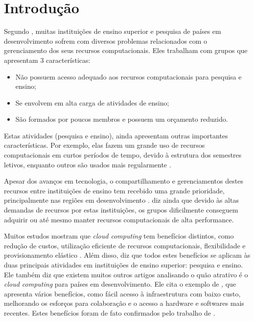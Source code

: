 \chapter{Introdução}

Segundo , muitas instituições de ensino superior e pesquisa
de países em desenvolvimento sofrem com diversos problemas relacionados com o gerenciamento dos
seus recursos computacionais. Eles trabalham com grupos que apresentam 3 características:

\begin{itemize}
    \item
        Não possuem acesso adequado aos recursos computacionais para pesquisa e ensino;
    \item
        Se envolvem em alta carga de atividades de ensino;
    \item
        São formados por poucos membros e possuem um orçamento reduzido.
\end{itemize}

Estas atividades (pesquisa e ensino), ainda apresentam outras importantes características.
Por exemplo, elas fazem um grande uso de recursos computacionais em curtos períodos
de tempo, devido à estrutura dos semestres letivos, enquanto outros são usados
mais regularmente \cite{book-cloud-developing-countries}.

Apesar dos avanços em tecnologia, o compartilhamento e gerenciamentos destes recursos
entre instituições de ensino tem recebido uma grande prioridade, principalmente nas
regiões em desenvolvimento \cite{article-sharing-importance}.
diz ainda que devido às altas demandas de recursos por estas instituições, os grupos dificilmente
conseguem adquirir ou até mesmo manter recursos computacionais de alta performance.

Muitos estudos mostram que \emph{cloud computing} tem benefícios distintos, como
redução de custos, utilização eficiente de recursos computacionais,
flexibilidade e provisionamento elástico \cite{article-cloud-cost-reduction}. Além disso,
 diz que todos estes benefícios se aplicam
às duas principais atividades em instituições de ensino superior: pesquisa e ensino. Ele
também diz que existem muitos outros artigos analisando o quão atrativo é o \emph{cloud computing}
para países em desenvolvimento. Ele cita o exemplo de ,
que apresenta vários benefícios, como fácil acesso à infraestrutura com baixo custo, melhorando
os esforços para colaboração e o acesso a hardware e softwares mais recentes. Estes benefícios
foram de fato confirmados pelo trabalho de .

